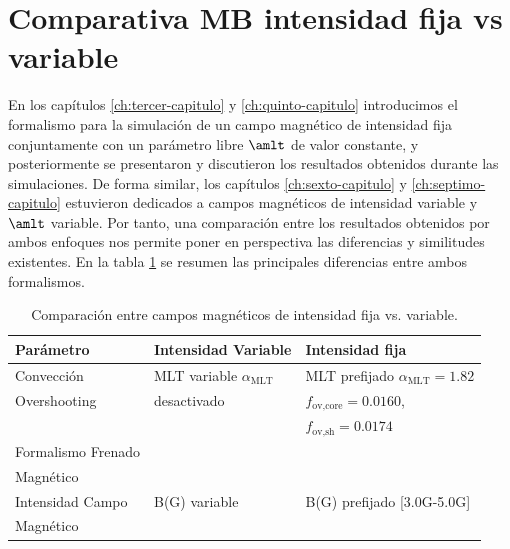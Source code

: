 \section{Comparativa MB intensidad fija vs variable}
En los capítulos \ref{ch:tercer-capitulo} y \ref{ch:quinto-capitulo} introducimos el formalismo para la simulación de un campo magnético de intensidad fija conjuntamente con un parámetro libre $\amlt$ de valor constante, y posteriormente se presentaron y discutieron los resultados obtenidos durante las simulaciones. De forma similar, los capítulos \ref{ch:sexto-capitulo} y \ref{ch:septimo-capitulo} estuvieron dedicados a campos magnéticos de intensidad variable y $\amlt$ variable. Por tanto, una comparación entre los resultados obtenidos por ambos enfoques nos permite poner en perspectiva las diferencias y similitudes existentes. En la tabla \ref{tab:caballero2023_2020} se resumen las principales diferencias entre ambos formalismos.\par 

\begin{table}
	\centering
	\begin{threeparttable}
		\begin{tabular}{lll} 
			\hline
			Parámetro & Intensidad Variable & Intensidad fija\\
			\hline
			Convección & MLT variable $\alpha_{\textrm{MLT}}$ & MLT prefijado $\alpha_{\textrm{MLT}}=1.82$\\
			Overshooting & desactivado & $f_{\textrm{ov,core}}=0.0160$,\\ & & $f_{\textrm{ov,sh}}=0.0174$\\
			Formalismo Frenado & \cite{Gallet2013} & \cite{Ud-Doula2008} \\ Magnético & & \\
			Intensidad Campo & B(G) variable & B(G) prefijado [3.0G-5.0G]\\ Magnético & & \\
			\hline
		\end{tabular}
	\end{threeparttable}
	\caption{Comparación entre campos magnéticos de intensidad fija vs. variable.} \label{tab:caballero2023_2020}
\end{table}

